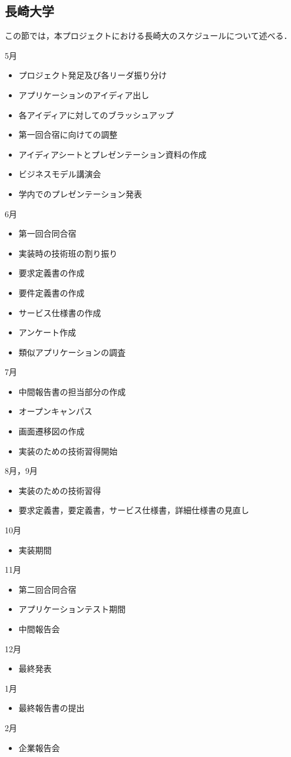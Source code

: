 \subsection{長崎大学}
\par
この節では，本プロジェクトにおける長崎大のスケジュールについて述べる．
\par
5月
\begin{itemize}
\item プロジェクト発足及び各リーダ振り分け
\item アプリケーションのアイディア出し
\item 各アイディアに対してのブラッシュアップ
\item 第一回合宿に向けての調整
\item アイディアシートとプレゼンテーション資料の作成
\item ビジネスモデル講演会
\item 学内でのプレゼンテーション発表
\end{itemize}
6月
\begin{itemize}
\item 第一回合同合宿
\item 実装時の技術班の割り振り
\item 要求定義書の作成
\item 要件定義書の作成
\item サービス仕様書の作成
\item アンケート作成
\item 類似アプリケーションの調査
\end{itemize}
7月
\begin{itemize}
\item 中間報告書の担当部分の作成
\item オープンキャンパス
\item 画面遷移図の作成
\item 実装のための技術習得開始
\end{itemize}
8月，9月
\begin{itemize}
\item 実装のための技術習得
\item 要求定義書，要定義書，サービス仕様書，詳細仕様書の見直し
\end{itemize}
10月
\begin{itemize}
\item 実装期間
\end{itemize}
11月
\begin{itemize}
\item 第二回合同合宿
\item アプリケーションテスト期間
\item 中間報告会
\end{itemize}
12月
\begin{itemize}
\item 最終発表
\end{itemize}
1月
\begin{itemize}
\item 最終報告書の提出
\end{itemize}
2月
\begin{itemize}
\item 企業報告会
\end{itemize}
